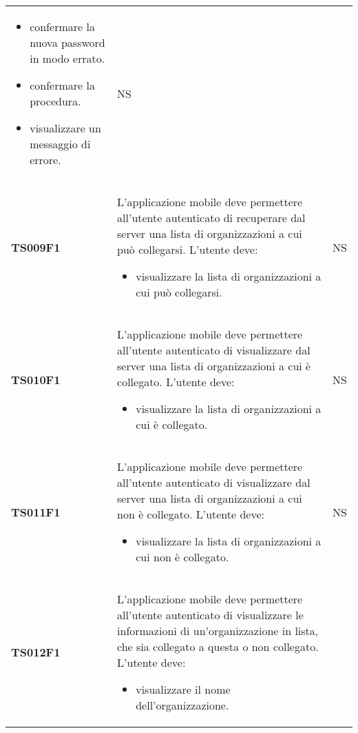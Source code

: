 \documentclass[../piano-di-qualifica.tex]{subfiles}
\begin{document}
\begin{centering}
\begin{longtable}[H]{>{\centering\bfseries}m{3cm} >{}p{10cm} >{\centering\arraybackslash}m{3cm}}
\begin{itemize}
                      \item confermare la nuova password in modo errato.
                      \item confermare la procedura.
                      \item visualizzare un messaggio di errore.
                    \end{itemize}
                  & NS \\
        TS009F1    & L'applicazione mobile deve permettere all'utente autenticato di recuperare dal server una lista di organizzazioni a cui può collegarsi. \newline
                    L'utente deve:
                    \begin{itemize}
                      \item visualizzare la lista di organizzazioni a cui può collegarsi.
                    \end{itemize}
                  & NS \\
        TS010F1    & L'applicazione mobile deve permettere all'utente autenticato di visualizzare dal server una lista di organizzazioni a cui è collegato. \newline
                    L'utente deve:
                    \begin{itemize}
                      \item visualizzare la lista di organizzazioni a cui è collegato.
                    \end{itemize}
                  & NS \\
        TS011F1    & L'applicazione mobile deve permettere all'utente autenticato di visualizzare dal server una lista di organizzazioni a cui non è collegato. \newline
                    L'utente deve:
                    \begin{itemize}
                      \item visualizzare la lista di organizzazioni a cui non è collegato.
                    \end{itemize}
                  & NS \\
        TS012F1    & L'applicazione mobile deve permettere all'utente autenticato di visualizzare le informazioni di un'organizzazione in lista, che sia collegato a questa o non collegato. \newline
                    L'utente deve:
                    \begin{itemize}
                      \item visualizzare il nome dell'organizzazione.

\end{itemize}
\end{longtable}
\end{centering}
\end{document}
